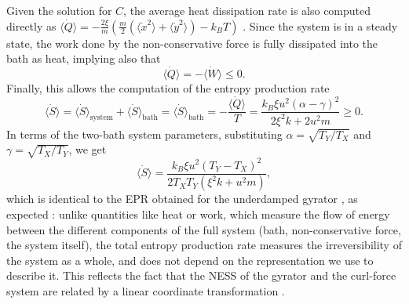 Given the solution for $C$, the average heat dissipation rate is also computed directly as $\langle \dot Q \rangle= -\frac{2\xi}{m}\left(\frac{m}{2}(\langle \dot{x}^2\rangle + \langle \dot{y}^2\rangle) - k_B T\right)$ \cite{sekimoto_stochastic_2010}. Since  the system is in a steady state, the work done by the non-conservative force is fully dissipated into the bath as heat, implying also that \begin{equation}\label{eq:heat}
\langle \dot{Q} \rangle=-\langle \dot{W}\rangle \leq 0.
\end{equation}
Finally, this allows the computation of the entropy production rate
\begin{equation}
    \langle \dot{S}\rangle=\langle \dot{S}\rangle_\text{system}+\langle \dot{S}\rangle_\text{bath}=\langle \dot{S} \rangle_\text{bath}=-\frac{\langle \dot{Q}\rangle}{T} = \frac{k_B \xi u^2(\alpha-\gamma)^2 }{2  \xi^{2}  k + 2  u^{2}  m } \geq 0.
\end{equation}
In terms of the two-bath system parameters, substituting $\alpha=\sqrt{T_Y/T_X}$ and $\gamma=\sqrt{T_X/T_Y}$, we get
\begin{equation}\label{eq:gyrator_EPR}
    \langle \dot{S}\rangle = \frac{k_B \xi u^2(T_Y-T_X)^2 }{2T_X T_Y(  \xi^{2}  k +  u^{2}  m)},
\end{equation}
which is identical to the EPR obtained for the underdamped gyrator \cite{bae2021inertial}, as expected \cite{godreche2019characterising}: unlike quantities like heat or work, which measure the flow of energy between the different components of the full system (bath, non-conservative force, the system itself), the total entropy production rate measures the irreversibility of the system as a whole, and does not depend on the representation we use to describe it. This reflects the fact that the NESS of the gyrator and the curl-force system are related by a linear coordinate transformation \cite{godreche2019characterising}.

